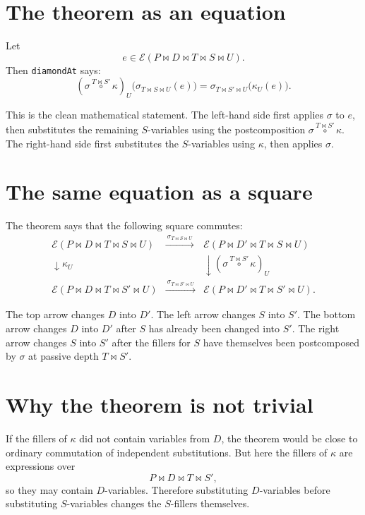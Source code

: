 \documentclass[11pt]{article}
\newcommand{\E}{\mathcal E}
\newcommand{\pcomp}[3]{#1 \overset{#2}{\circ} #3}
\begin{document}
\section*{The theorem as an equation}

Let
\[
  e \in \E(P \bowtie D \bowtie T \bowtie S \bowtie U).
\]
Then \texttt{diamondAt} says:
\[
\boxed{
  (\pcomp{\sigma}{T \bowtie S'}{\kappa})_U
  \bigl(
    \sigma_{T \bowtie S \bowtie U}(e)
  \bigr)
  =
  \sigma_{T \bowtie S' \bowtie U}
  \bigl(
    \kappa_U(e)
  \bigr).
}
\]

This is the clean mathematical statement.  The left-hand side first applies
\(\sigma\) to \(e\), then substitutes the remaining \(S\)-variables using the
postcomposition \(\pcomp{\sigma}{T \bowtie S'}{\kappa}\).  The right-hand
side first substitutes the \(S\)-variables using \(\kappa\), then applies
\(\sigma\).

\section*{The same equation as a square}

The theorem says that the following square commutes:
\[
\begin{array}{ccc}
\E(P \bowtie D \bowtie T \bowtie S \bowtie U)
& \xrightarrow{\ \sigma_{T \bowtie S \bowtie U}\ } &
\E(P \bowtie D' \bowtie T \bowtie S \bowtie U)
\\[0.8em]
\downarrow{\kappa_U} && \downarrow{(\pcomp{\sigma}{T \bowtie S'}{\kappa})_U}
\\[0.8em]
\E(P \bowtie D \bowtie T \bowtie S' \bowtie U)
& \xrightarrow{\ \sigma_{T \bowtie S' \bowtie U}\ } &
\E(P \bowtie D' \bowtie T \bowtie S' \bowtie U).
\end{array}
\]

The top arrow changes \(D\) into \(D'\).  The left arrow changes \(S\) into
\(S'\).  The bottom arrow changes \(D\) into \(D'\) after \(S\) has already
been changed into \(S'\).  The right arrow changes \(S\) into \(S'\) after the
fillers for \(S\) have themselves been postcomposed by \(\sigma\) at passive
depth \(T \bowtie S'\).

\section*{Why the theorem is not trivial}

If the fillers of \(\kappa\) did not contain variables from \(D\), the theorem
would be close to ordinary commutation of independent substitutions.  But here
the fillers of \(\kappa\) are expressions over
\[
  P \bowtie D \bowtie T \bowtie S',
\]
so they may contain \(D\)-variables.  Therefore substituting \(D\)-variables
before substituting \(S\)-variables changes the \(S\)-fillers themselves.
\end{document}
